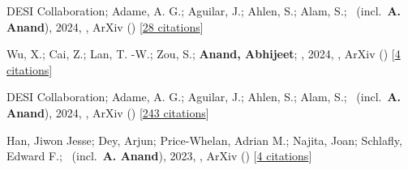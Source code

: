 \item[{\color{numcolor}\scriptsize4}] DESI Collaboration; Adame, A. G.; Aguilar, J.; Ahlen, S.; Alam, S.; \etal\ (incl.\ \textbf{A. Anand}), 2024, , ArXiv () [\href{https://ui.adsabs.harvard.edu/abs/2024arXiv241112020D}{28 citations}]

\item[{\color{numcolor}\scriptsize3}] Wu, X.; Cai, Z.; Lan, T. -W.; Zou, S.; \textbf{Anand, Abhijeet}; \etal, 2024, , ArXiv () [\href{https://ui.adsabs.harvard.edu/abs/2024arXiv240717809W}{4 citations}]

\item[{\color{numcolor}\scriptsize2}] DESI Collaboration; Adame, A. G.; Aguilar, J.; Ahlen, S.; Alam, S.; \etal\ (incl.\ \textbf{A. Anand}), 2024, , ArXiv () [\href{https://ui.adsabs.harvard.edu/abs/2024arXiv240403000D}{243 citations}]

\item[{\color{numcolor}\scriptsize1}] Han, Jiwon Jesse; Dey, Arjun; Price-Whelan, Adrian M.; Najita, Joan; Schlafly, Edward F.; \etal\ (incl.\ \textbf{A. Anand}), 2023, , ArXiv () [\href{https://ui.adsabs.harvard.edu/abs/2023arXiv230611784H}{4 citations}]